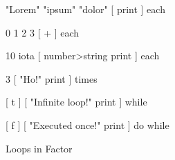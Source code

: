 \centering

\begin{minipage}{0.65\linewidth}
  \begin{factorcode}
    { "Lorem" "ipsum" "dolor" } [ print ] each

    0 { 1 2 3 } [ + ] each

    10 iota [ number>string print ] each

    3 [ "Ho!" print ] times

    [ t ] [ "Infinite loop!" print ] while

    [ f ] [ "Executed once!" print ] do while
  \end{factorcode}
\end{minipage}

\caption{Loops in Factor}
